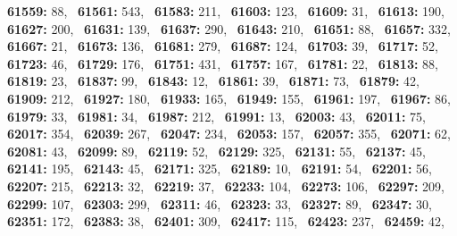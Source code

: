 \textbf{61559:} 88,\allowbreak~ 
\textbf{61561:} 543,\allowbreak~ 
\textbf{61583:} 211,\allowbreak~ 
\textbf{61603:} 123,\allowbreak~ 
\textbf{61609:} 31,\allowbreak~ 
\textbf{61613:} 190,\allowbreak~ 
\textbf{61627:} 200,\allowbreak~ 
\textbf{61631:} 139,\allowbreak~ 
\textbf{61637:} 290,\allowbreak~ 
\textbf{61643:} 210,\allowbreak~ 
\textbf{61651:} 88,\allowbreak~ 
\textbf{61657:} 332,\allowbreak~ 
\textbf{61667:} 21,\allowbreak~ 
\textbf{61673:} 136,\allowbreak~ 
\textbf{61681:} 279,\allowbreak~ 
\textbf{61687:} 124,\allowbreak~ 
\textbf{61703:} 39,\allowbreak~ 
\textbf{61717:} 52,\allowbreak~ 
\textbf{61723:} 46,\allowbreak~ 
\textbf{61729:} 176,\allowbreak~ 
\textbf{61751:} 431,\allowbreak~ 
\textbf{61757:} 167,\allowbreak~ 
\textbf{61781:} 22,\allowbreak~ 
\textbf{61813:} 88,\allowbreak~ 
\textbf{61819:} 23,\allowbreak~ 
\textbf{61837:} 99,\allowbreak~ 
\textbf{61843:} 12,\allowbreak~ 
\textbf{61861:} 39,\allowbreak~ 
\textbf{61871:} 73,\allowbreak~ 
\textbf{61879:} 42,\allowbreak~ 
\textbf{61909:} 212,\allowbreak~ 
\textbf{61927:} 180,\allowbreak~ 
\textbf{61933:} 165,\allowbreak~ 
\textbf{61949:} 155,\allowbreak~ 
\textbf{61961:} 197,\allowbreak~ 
\textbf{61967:} 86,\allowbreak~ 
\textbf{61979:} 33,\allowbreak~ 
\textbf{61981:} 34,\allowbreak~ 
\textbf{61987:} 212,\allowbreak~ 
\textbf{61991:} 13,\allowbreak~ 
\textbf{62003:} 43,\allowbreak~ 
\textbf{62011:} 75,\allowbreak~ 
\textbf{62017:} 354,\allowbreak~ 
\textbf{62039:} 267,\allowbreak~ 
\textbf{62047:} 234,\allowbreak~ 
\textbf{62053:} 157,\allowbreak~ 
\textbf{62057:} 355,\allowbreak~ 
\textbf{62071:} 62,\allowbreak~ 
\textbf{62081:} 43,\allowbreak~ 
\textbf{62099:} 89,\allowbreak~ 
\textbf{62119:} 52,\allowbreak~ 
\textbf{62129:} 325,\allowbreak~ 
\textbf{62131:} 55,\allowbreak~ 
\textbf{62137:} 45,\allowbreak~ 
\textbf{62141:} 195,\allowbreak~ 
\textbf{62143:} 45,\allowbreak~ 
\textbf{62171:} 325,\allowbreak~ 
\textbf{62189:} 10,\allowbreak~ 
\textbf{62191:} 54,\allowbreak~ 
\textbf{62201:} 56,\allowbreak~ 
\textbf{62207:} 215,\allowbreak~ 
\textbf{62213:} 32,\allowbreak~ 
\textbf{62219:} 37,\allowbreak~ 
\textbf{62233:} 104,\allowbreak~ 
\textbf{62273:} 106,\allowbreak~ 
\textbf{62297:} 209,\allowbreak~ 
\textbf{62299:} 107,\allowbreak~ 
\textbf{62303:} 299,\allowbreak~ 
\textbf{62311:} 46,\allowbreak~ 
\textbf{62323:} 33,\allowbreak~ 
\textbf{62327:} 89,\allowbreak~ 
\textbf{62347:} 30,\allowbreak~ 
\textbf{62351:} 172,\allowbreak~ 
\textbf{62383:} 38,\allowbreak~ 
\textbf{62401:} 309,\allowbreak~ 
\textbf{62417:} 115,\allowbreak~ 
\textbf{62423:} 237,\allowbreak~ 
\textbf{62459:} 42,\allowbreak~ 
